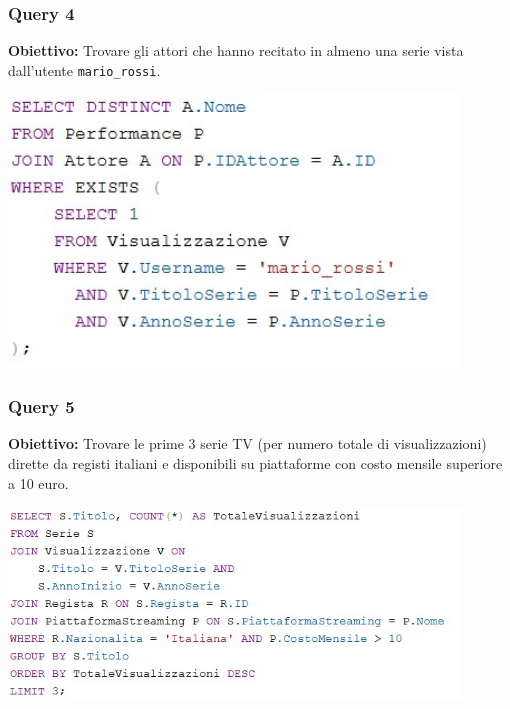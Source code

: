 \documentclass[12pt,a4paper]{article}
\begin{document}
\vspace{1cm}

\subsubsection*{Query 4}
\textbf{Obiettivo:} Trovare gli attori che hanno recitato in almeno una serie vista dall’utente \texttt{mario\_rossi}.

\vspace{0.5cm}
\begin{center}
\includegraphics[width=0.9\textwidth]{Query4.jpg}
\end{center}

\vspace{1cm}

\subsubsection*{Query 5}
\textbf{Obiettivo:} Trovare le prime 3 serie TV (per numero totale di visualizzazioni) dirette da registi italiani e disponibili su piattaforme con costo mensile superiore a 10 euro.

\vspace{0.5cm}
\begin{center}
\includegraphics[width=0.9\textwidth]{Query5.jpg}
\end{center}

\vspace{1cm}
\end{document}

